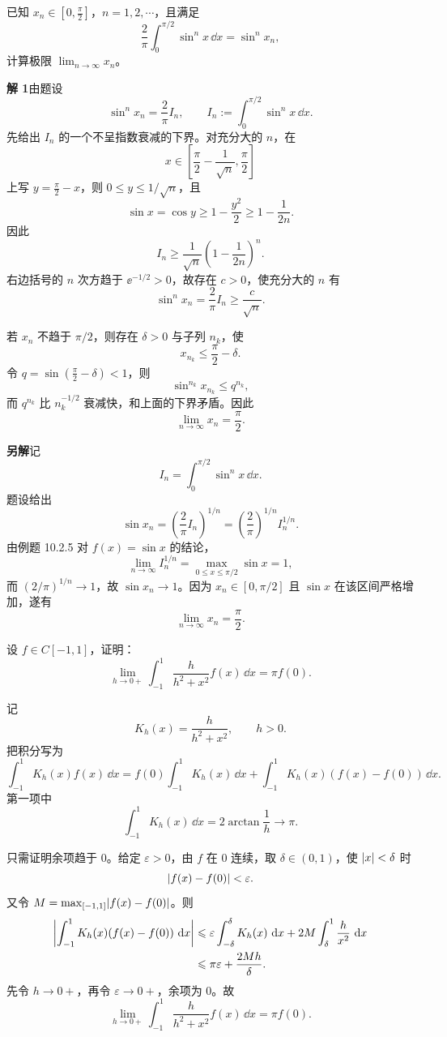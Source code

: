 \begin{xexercise}[6]
已知 $x_n\in[0,\frac\pi2]$，$n=1,2,\cdots$，且满足
\[
  \frac2\pi\int_0^{\pi/2}\sin^n x\,\dd x=\sin^n x_n,
\]
计算极限 $\lim_{n\to\infty}x_n$。
\end{xexercise}
\begin{xsolution}
\textbf{解 1}\quad 由题设
\[
  \sin^n x_n=\frac2\pi I_n,
  \qquad
  I_n:=\int_0^{\pi/2}\sin^n x\,\dd x.
\]
先给出 $I_n$ 的一个不呈指数衰减的下界。对充分大的 $n$，在
\[
  x\in\left[\frac\pi2-\frac1{\sqrt n},\frac\pi2\right]
\]
上写 $y=\frac\pi2-x$，则 $0\leqslant y\leqslant1/\sqrt n$，且
\[
  \sin x=\cos y\geqslant1-\frac{y^2}{2}
  \geqslant1-\frac1{2n}.
\]
因此
\[
  I_n\geqslant\frac1{\sqrt n}
  \left(1-\frac1{2n}\right)^n.
\]
右边括号的 $n$ 次方趋于 $\ee^{-1/2}>0$，故存在 $c>0$，使充分大的 $n$ 有
\[
  \sin^n x_n=\frac2\pi I_n\geqslant\frac{c}{\sqrt n}.
\]

若 $x_n$ 不趋于 $\pi/2$，则存在 $\delta>0$ 与子列 $n_k$，使
\[
  x_{n_k}\leqslant\frac\pi2-\delta.
\]
令 $q=\sin(\frac\pi2-\delta)<1$，则
\[
  \sin^{n_k}x_{n_k}\leqslant q^{n_k},
\]
而 $q^{n_k}$ 比 $n_k^{-1/2}$ 衰减快，和上面的下界矛盾。因此
\[
  \boxed{\lim_{n\to\infty}x_n=\frac\pi2}.
\]

\textbf{另解}\quad 记
\[
  I_n=\int_0^{\pi/2}\sin^n x\,\dd x.
\]
题设给出
\[
  \sin x_n=\left(\frac2\pi I_n\right)^{1/n}
  =\left(\frac2\pi\right)^{1/n}I_n^{1/n}.
\]
由例题 10.2.5 对 $f(x)=\sin x$ 的结论，
\[
  \lim_{n\to\infty}I_n^{1/n}
  =\max_{0\leqslant x\leqslant\pi/2}\sin x=1,
\]
而 $(2/\pi)^{1/n}\to1$，故 $\sin x_n\to1$。因为 $x_n\in[0,\pi/2]$ 且 $\sin x$ 在该区间严格增加，遂有
\[
  \boxed{\lim_{n\to\infty}x_n=\frac\pi2}.
\]
\end{xsolution}


\begin{xexercise}[7]
设 $f\in C[-1,1]$，证明：
\[
  \lim_{h\to0+}\int_{-1}^1\frac{h}{h^2+x^2}f(x)\,\dd x=\pi f(0).
\]
\end{xexercise}
\begin{xsolution}
记
\[
  K_h(x)=\frac{h}{h^2+x^2},\qquad h>0.
\]
把积分写为
\[
  \int_{-1}^1K_h(x)f(x)\,\dd x
  =f(0)\int_{-1}^1K_h(x)\,\dd x
  +\int_{-1}^1K_h(x)(f(x)-f(0))\,\dd x.
\]
第一项中
\[
  \int_{-1}^1K_h(x)\,\dd x
  =2\arctan\frac1h\longrightarrow\pi.
\]

只需证明余项趋于 $0$。给定 $\varepsilon>0$，由 $f$ 在 $0$ 连续，取 $\delta\in(0,1)$，使 $\abs{x}<\delta$ 时
\[
  \abs{f(x)-f(0)}<\varepsilon.
\]
又令 $M=\max_{[-1,1]}\abs{f(x)-f(0)}$。则
\begin{align*}
  \abs*{\int_{-1}^1K_h(x)(f(x)-f(0))\,\dd x}
  &\leqslant
  \varepsilon\int_{-\delta}^{\delta}K_h(x)\,\dd x
  +2M\int_\delta^1\frac{h}{x^2}\,\dd x\\
  &\leqslant \pi\varepsilon+\frac{2Mh}{\delta}.
\end{align*}
先令 $h\to0+$，再令 $\varepsilon\to0+$，余项为 $0$。故
\[
  \boxed{\lim_{h\to0+}\int_{-1}^1\frac{h}{h^2+x^2}f(x)\,\dd x=\pi f(0)}.
\]
\end{xsolution}


